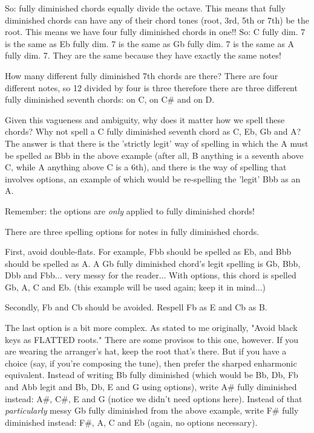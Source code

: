 So: fully diminished chords equally divide the octave. This means that fully
diminished chords can have any of their chord tones (root, 3rd, 5th or 7th)
be the root. This means we have four fully diminished chords in one!! So:
C fully dim. 7 is the same as Eb fully dim. 7 is the same as Gb fully dim. 7
is the same as A fully dim. 7. They are the same because they have exactly
the same notes!

How many different fully diminished 7th chords are there? There are four
different notes, so 12 divided by four is three therefore there are three
different fully diminished seventh chords: on C, on C\# and on D.

Given this vagueness and ambiguity, why does it matter how we spell these
chords? Why not spell a C fully diminished seventh chord as C, Eb, Gb and A?
The answer is that there is the 'strictly legit' way of spelling in which the
A must be spelled as Bbb in the above example (after all, B anything is a
seventh above C, while A anything above C is a 6th), and there is the way of
spelling that involves options, an example of which would be re-spelling the
'legit' Bbb as an A.

Remember: the options are \emph{only} applied to fully diminished chords!

There are three spelling options for notes in fully diminished chords.

First, avoid double-flats. For example, Fbb should be spelled as Eb, and
Bbb should be spelled as A. A Gb fully diminished chord's legit spelling
is Gb, Bbb, Dbb and Fbb... very messy for the reader... With options, this
chord is spelled Gb, A, C and Eb. (this example will be used again; keep it
in mind...)

Secondly, Fb and Cb should be avoided. Respell Fb as E and Cb as B.

The last option is a bit more complex. As stated to me originally, "Avoid
black keys as FLATTED roots." There are some provisos to this one, however.
If you are wearing the arranger's hat, keep the root that's there. But if
you have a choice (say, if you're composing the tune), then prefer the
sharped enharmonic equivalent. Instead of writing Bb fully diminished (which
would be Bb, Db, Fb and Abb legit and Bb, Db, E and G using options), write
A\# fully diminished instead: A\#, C\#, E and G (notice we didn't need options
here). Instead of that \emph{particularly} messy Gb fully diminished from the
above example, write F\# fully diminished instead: F\#, A, C and Eb (again,
no options necessary).

